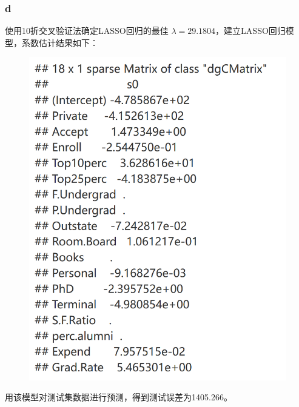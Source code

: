 \documentclass[12pt,a4paper]{article}
\begin{document}
    \subsubsection*{d}
    使用10折交叉验证法确定LASSO回归的最佳 $\lambda=29.1804$，建立LASSO回归模型，系数估计结果如下：
    \begin{figure}[H]
        \centering
        \includegraphics[scale=0.25]{LASSO.png}
    \end{figure}
    用该模型对测试集数据进行预测，得到测试误差为1405.266。
\end{document}
